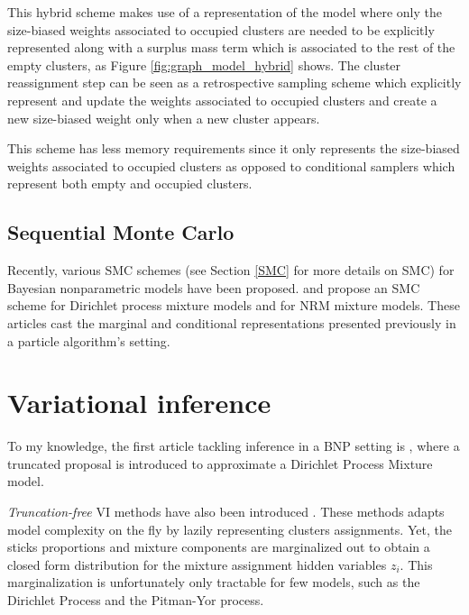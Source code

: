 This hybrid scheme makes use of a representation of the model where only the size-biased weights associated to occupied clusters are needed to be explicitly represented along with a surplus mass term which is associated to the rest of the empty clusters, as Figure \ref{fig:graph_model_hybrid} shows.
The cluster reassignment step can be seen as a retrospective sampling scheme which explicitly represent and update the weights associated to occupied clusters and create a new size-biased weight only when a new cluster appears.

This scheme has less memory requirements since it only represents the size-biased weights associated to occupied clusters as opposed to conditional samplers which represent both empty and occupied clusters.


\subsection{Sequential Monte Carlo}
Recently, various \gls{SMC} schemes (see Section \ref{SMC} for more details on \gls{SMC}) for Bayesian nonparametric models have been proposed.
\cite{Fearnhead:2004gi} and \cite{Wood:2008hx} propose an \gls{SMC} scheme for Dirichlet process mixture models and \cite{Griffin:2017cz} for \gls{NRM} mixture models.
These articles cast the marginal and conditional representations presented previously in a particle algorithm's setting.

\section{Variational inference} \label{BNP_VI}
To my knowledge, the first article tackling inference in a \gls{BNP} setting is \cite{Blei:2006fo}, where
a truncated proposal is introduced to approximate a Dirichlet Process Mixture model.

\textit{Truncation-free} \acrlong{VI} methods have also been introduced \cite{Blei:2012uu}. These methods adapts model complexity on the fly by lazily representing clusters assignments. Yet, the sticks proportions and mixture components are marginalized out to obtain a closed form distribution for the mixture assignment hidden variables $z_i$. This marginalization is unfortunately only tractable for few models, such as the Dirichlet Process and the Pitman-Yor process.
